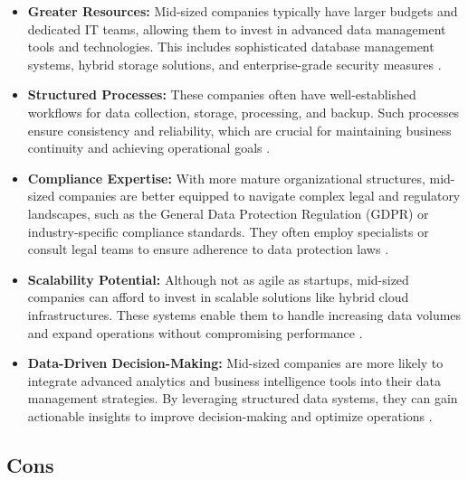 \documentclass{article}
\begin{document}
\begin{itemize}
    \item \textbf{Greater Resources:} Mid-sized companies typically have larger budgets and dedicated IT teams, allowing them to invest in advanced data management tools and technologies. This includes sophisticated database management systems, hybrid storage solutions, and enterprise-grade security measures \cite{johnson2020investing}.
    
    \item \textbf{Structured Processes:} These companies often have well-established workflows for data collection, storage, processing, and backup. Such processes ensure consistency and reliability, which are crucial for maintaining business continuity and achieving operational goals \cite{smith2019importance}.
    
    \item \textbf{Compliance Expertise:} With more mature organizational structures, mid-sized companies are better equipped to navigate complex legal and regulatory landscapes, such as the General Data Protection Regulation (GDPR) or industry-specific compliance standards. They often employ specialists or consult legal teams to ensure adherence to data protection laws \cite{european2019gdpr}.
    
    \item \textbf{Scalability Potential:} Although not as agile as startups, mid-sized companies can afford to invest in scalable solutions like hybrid cloud infrastructures. These systems enable them to handle increasing data volumes and expand operations without compromising performance \cite{williams2021scalability}.
    
    \item \textbf{Data-Driven Decision-Making:} Mid-sized companies are more likely to integrate advanced analytics and business intelligence tools into their data management strategies. By leveraging structured data systems, they can gain actionable insights to improve decision-making and optimize operations \cite{mckinsey2020analytics}.
\end{itemize}

\subsection*{Cons}
\end{document}
